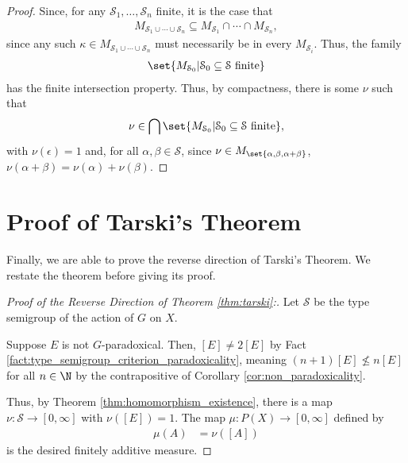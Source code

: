 \begin{proof}
  Since, for any $\mathcal{S}_1,\dots,\mathcal{S}_n$ finite, it is the case that
  \begin{align*}
    M_{\mathcal{S}_1\cup\cdots\cup \mathcal{S}_n} \subseteq M_{\mathcal{S}_1} \cap \cdots \cap M_{\mathcal{S}_n},
  \end{align*}
  since any such $\kappa\in M_{\mathcal{S}_1\cup\cdots\cup \mathcal{S}_n}$ must necessarily be in every $M_{\mathcal{S}_i}$. Thus, the family
  \begin{align*}
    \set{M_{\mathcal{S}_0}| \mathcal{S}_0\subseteq \mathcal{S}\text{ finite}}
  \end{align*}
  has the finite intersection property. Thus, by compactness, there is some $\nu$ such that
  \begin{align*}
    \nu\in \bigcap\set{M_{\mathcal{S}_0}| \mathcal{S}_0\subseteq \mathcal{S}\text{ finite}},
  \end{align*}
  with $\nu\left(\epsilon\right) = 1$ and, for all $\alpha,\beta\in \mathcal{S}$, since $\nu\in M_{\set{\alpha,\beta,\alpha + \beta}}$, $\nu\left(\alpha + \beta\right) = \nu\left(\alpha\right) + \nu\left(\beta\right)$.
\end{proof}
\section{Proof of Tarski's Theorem}%
Finally, we are able to prove the reverse direction of Tarski's Theorem. We restate the theorem before giving its proof.
\begin{tcolorbox}[blanker,breakable,left=3mm,before skip=10pt, after skip=10pt, borderline west={1pt}{0pt}{blue!50!white},sharp corners,]
\tarski*
\end{tcolorbox}
\begin{proof}[Proof of the Reverse Direction of Theorem \ref{thm:tarski}:]
  Let $\mathcal{S}$ be the type semigroup of the action of $G$ on $X$.\newline

  Suppose $E$ is not $G$-paradoxical. Then, $\left[E\right]\neq 2\left[E\right]$ by Fact \ref{fact:type_semigroup_criterion_paradoxicality}, meaning $\left(n+1\right)\left[E\right]\nleq n\left[E\right]$ for all $n\in \N$ by the contrapositive of Corollary \ref{cor:non_paradoxicality}.\newline

  Thus, by Theorem \ref{thm:homomorphism_existence}, there is a map $\nu\colon \mathcal{S}\rightarrow [0,\infty]$ with $\nu\left(\left[E\right]\right) = 1$. The map $\mu\colon P(X)\rightarrow [0,\infty]$ defined by
  \begin{align*}
    \mu\left(A\right) &= \nu\left(\left[A\right]\right)
  \end{align*}
  is the desired finitely additive measure.
\end{proof}
